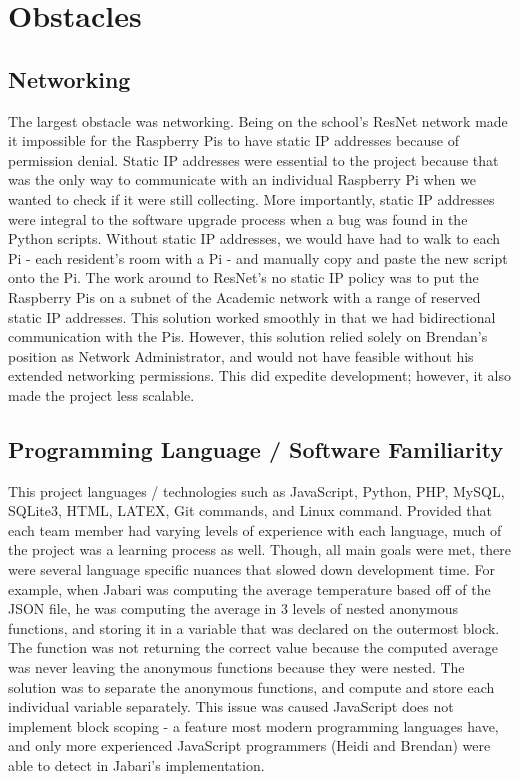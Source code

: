 \documentclass{article}
\begin{document}
	\newpage
	\section{Obstacles}\label{sec:obstacles}	
		\subsection{Networking}						
			The largest obstacle was networking. Being on the school's ResNet network made it impossible for the Raspberry Pis to have static IP addresses 
			because of permission denial. Static IP addresses were essential to the project because that was the only way to communicate with an individual 
			Raspberry Pi when we wanted to check if it were still collecting. More importantly, static IP addresses were integral to the software upgrade 
			process when a bug was found in the Python scripts. Without static IP addresses, we would have had to walk to each Pi - each resident's room with 
			a Pi - and manually copy and paste the new script onto the Pi. The work around to ResNet's no static IP policy was to put the Raspberry Pis on a 	
			subnet of the Academic network with a range of reserved static IP addresses. This solution worked smoothly in that we had bidirectional 
			communication with the Pis. However, this solution relied solely on Brendan's position as Network Administrator, and would not have feasible 
			without his extended networking permissions. This did expedite development; however, it also made the project less scalable.
			
		\subsection{Programming Language / Software Familiarity}
			This project languages / technologies such as JavaScript, Python, PHP, MySQL, SQLite3, HTML, LATEX, Git commands, and Linux command. Provided
			that each team member had varying levels of experience with each language, much of the project was a learning process as well. Though, all main 
			goals were met, there were several language specific nuances that slowed down development time. For example, when Jabari was computing the average
			temperature based off of the JSON file, he was computing the average in 3 levels of nested anonymous functions, and storing it in a variable 
			that was declared on the outermost block. The function was not returning the correct value because the computed average was never leaving the 
			anonymous functions because they were nested. The solution was to separate the anonymous functions, and compute and store each individual variable 
			separately. This issue was caused JavaScript does not implement block scoping - a feature most modern programming languages have, and only more
			experienced JavaScript programmers (Heidi and Brendan) were able to detect in Jabari's implementation.
		
\end{document}
